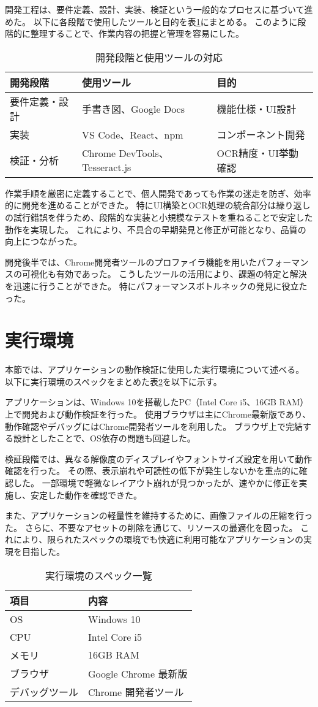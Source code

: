 \documentclass[main]{subfiles}
\begin{document}
開発工程は、要件定義、設計、実装、検証という一般的なプロセスに基づいて進めた。  
以下に各段階で使用したツールと目的を表\ref{tab:dev_phases}にまとめる。  
このように段階的に整理することで、作業内容の把握と管理を容易にした。

\begin{table}[htbp]
\centering
\caption{開発段階と使用ツールの対応}
\label{tab:dev_phases}
\begin{tabular}{lll}
\hline
開発段階 & 使用ツール & 目的 \\
\hline
要件定義・設計 & 手書き図、Google Docs & 機能仕様・UI設計 \\
実装 & VS Code、React、npm & コンポーネント開発 \\
検証・分析 & Chrome DevTools、Tesseract.js & OCR精度・UI挙動確認 \\
\hline
\end{tabular}
\end{table}

作業手順を厳密に定義することで、個人開発であっても作業の迷走を防ぎ、効率的に開発を進めることができた。  
特にUI構築とOCR処理の統合部分は繰り返しの試行錯誤を伴うため、段階的な実装と小規模なテストを重ねることで安定した動作を実現した。  
これにより、不具合の早期発見と修正が可能となり、品質の向上につながった。

開発後半では、Chrome開発者ツールのプロファイラ機能を用いたパフォーマンスの可視化も有効であった。  
こうしたツールの活用により、課題の特定と解決を迅速に行うことができた。  
特にパフォーマンスボトルネックの発見に役立たった。
\section{実行環境}
本節では、アプリケーションの動作検証に使用した実行環境について述べる。
以下に実行環境のスペックをまとめた表\ref{tab:execution_environment}を以下に示す。

アプリケーションは、Windows 10を搭載したPC（Intel Core i5、16GB RAM）上で開発および動作検証を行った。  
使用ブラウザは主にChrome最新版であり、動作確認やデバッグにはChrome開発者ツールを利用した。  
ブラウザ上で完結する設計としたことで、OS依存の問題も回避した。

検証段階では、異なる解像度のディスプレイやフォントサイズ設定を用いて動作確認を行った。
その際、表示崩れや可読性の低下が発生しないかを重点的に確認した。
一部環境で軽微なレイアウト崩れが見つかったが、速やかに修正を実施し、安定した動作を確認できた。

また、アプリケーションの軽量性を維持するために、画像ファイルの圧縮を行った。
さらに、不要なアセットの削除を通じて、リソースの最適化を図った。
これにより、限られたスペックの環境でも快適に利用可能なアプリケーションの実現を目指した。

\begin{table}[htbp]
\centering
\caption{実行環境のスペック一覧}
\label{tab:execution_environment}
\begin{tabular}{ll}
\hline
項目 & 内容 \\
\hline
OS & Windows 10 \\
CPU & Intel Core i5 \\
メモリ & 16GB RAM \\
ブラウザ & Google Chrome 最新版 \\
デバッグツール & Chrome 開発者ツール \\
\hline
\end{tabular}
\end{table}
\end{document}
